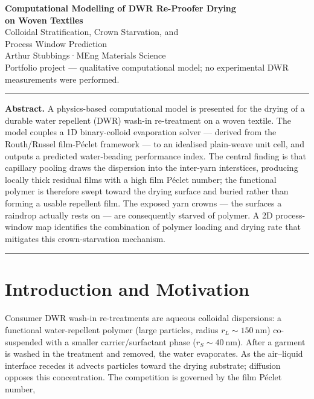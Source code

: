 \documentclass[11pt,a4paper]{article}
\begin{document}
\begin{center}
  {\Large\bfseries Computational Modelling of DWR Re-Proofer Drying\\[4pt]
  on Woven Textiles}\\[8pt]
  {\normalsize Colloidal Stratification, Crown Starvation, and\\
  Process Window Prediction}\\[10pt]
  {\small Arthur Stubbings\quad·\quad MEng Materials Science}\\[2pt]
  {\small\color{gray} Portfolio project — qualitative computational model;
  no experimental DWR measurements were performed.}
\end{center}

\vspace{2pt}\hrule\vspace{10pt}

\textbf{Abstract.}\;
A physics-based computational model is presented for the drying of a
durable water repellent (DWR) wash-in re-treatment on a woven textile.
The model couples a 1D binary-colloid evaporation solver — derived from the
Routh/Russel film-P\'{e}clet framework — to an idealised plain-weave unit cell,
and outputs a predicted water-beading performance index.
The central finding is that capillary pooling draws the dispersion into the
inter-yarn interstices, producing locally thick residual films with a high
film P\'{e}clet number; the functional polymer is therefore swept toward the
drying surface and buried rather than forming a usable repellent film.
The exposed yarn crowns — the surfaces a raindrop actually rests on — are
consequently starved of polymer.
A 2D process-window map identifies the combination of polymer loading and
drying rate that mitigates this crown-starvation mechanism.

\vspace{6pt}\hrule\vspace{10pt}

\section{Introduction and Motivation}

Consumer DWR wash-in re-treatments are aqueous colloidal dispersions: a
functional water-repellent polymer (large particles, radius
$r_{L} \sim \SI{150}{\nano\metre}$) co-suspended with a smaller
carrier/surfactant phase ($r_{S} \sim \SI{40}{\nano\metre}$).
After a garment is washed in the treatment and removed, the water
evaporates.
As the air--liquid interface recedes it advects particles toward the drying
substrate; diffusion opposes this concentration.
The competition is governed by the film P\'{e}clet number,
\end{document}
